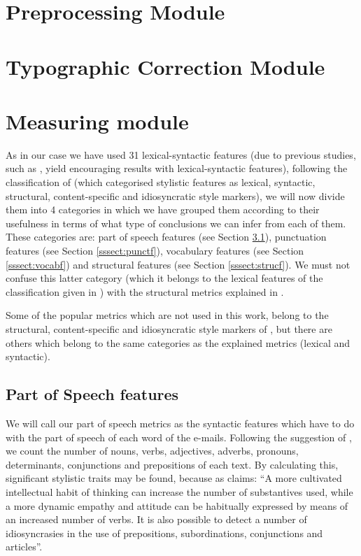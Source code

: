 \section{Preprocessing Module} \label{ssection:prepmod}

\section{Typographic Correction Module} \label{ssection:typomod}

\section{Measuring module} \label{ssection:measmod}

As in our case we have used 31 lexical-syntactic features (due to previous studies, such as \cite{homem2011authorship}, yield encouraging results with lexical-syntactic features), following the classification of \cite{abbasi2008writeprints} (which categorised stylistic features as lexical, syntactic, structural, content-specific and idiosyncratic style markers), we will now divide them into 4 categories in which we have grouped them according to their usefulness in terms of what type of conclusions we can infer from each of them. These categories are: part of speech features (see Section \ref{sssect:posf}), punctuation features (see Section \ref{sssect:punctf}), vocabulary features (see Section \ref{sssect:vocabf}) and structural features (see Section \ref{sssect:strucf}). We must not confuse this latter category (which it belongs to the lexical features of the classification given in \cite{abbasi2008writeprints}) with the structural metrics explained in \cite{abbasi2008writeprints}.

Some of the popular metrics which are not used in this work, belong to the structural, content-specific and idiosyncratic style markers of \cite{abbasi2008writeprints}, but there are others which belong to the same categories as the explained metrics (lexical and syntactic).

\subsection{Part of Speech features}\label{sssect:posf}

We will call our part of speech metrics as the syntactic features which have to do with the part of speech of each word of the e-mails. Following the suggestion of \cite{holmes1985analysis}, we count the number of nouns, verbs, adjectives, adverbs, pronouns, determinants, conjunctions and prepositions of each text. By calculating this, significant stylistic traits may be found, because as \cite{somers1966statistical} claims: ``A more cultivated intellectual habit of thinking can increase the number of substantives used, while a more dynamic empathy and attitude can be habitually expressed by means of an increased number of verbs. It is also possible to detect a number of idiosyncrasies in the use of prepositions, subordinations, conjunctions and articles''.


